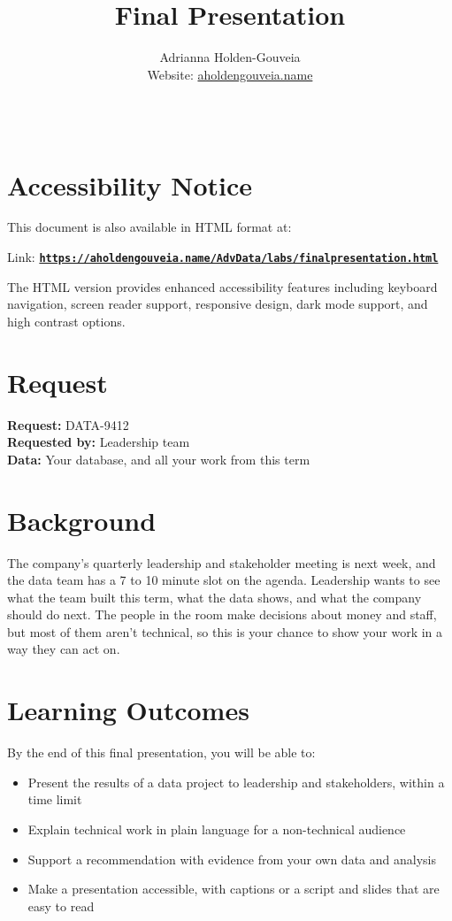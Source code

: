 \documentclass[12pt]{article}
\title{Final Presentation}
\author{
        Adrianna Holden-Gouveia \\
        Website: \href{https://aholdengouveia.name}{aholdengouveia.name}\\ 
        \date{\vspace{-5ex}}
        \faGithub {: aholdengouveia} \\
        }
\begin{document}
    

\maketitle



\section*{Accessibility Notice}
This document is also available in HTML format at:

Link: \href{https://aholdengouveia.name/AdvData/labs/finalpresentation.html}{\textbf{\nolinkurl{https://aholdengouveia.name/AdvData/labs/finalpresentation.html}}}

The HTML version provides enhanced accessibility features including keyboard navigation, screen reader support, responsive design, dark mode support, and high contrast options.

\section*{Request}
\noindent\textbf{Request:} DATA-9412\\
\textbf{Requested by:} Leadership team\\
\textbf{Data:} Your database, and all your work from this term

\section*{Background}
The company's quarterly leadership and stakeholder meeting is next week, and the data team has a 7 to 10 minute slot on the agenda. Leadership wants to see what the team built this term, what the data shows, and what the company should do next. The people in the room make decisions about money and staff, but most of them aren't technical, so this is your chance to show your work in a way they can act on.

\section*{Learning Outcomes}
By the end of this final presentation, you will be able to:
\begin{itemize}
    \item Present the results of a data project to leadership and stakeholders, within a time limit
    \item Explain technical work in plain language for a non-technical audience
    \item Support a recommendation with evidence from your own data and analysis
    \item Make a presentation accessible, with captions or a script and slides that are easy to read
\end{itemize}
\end{document}
